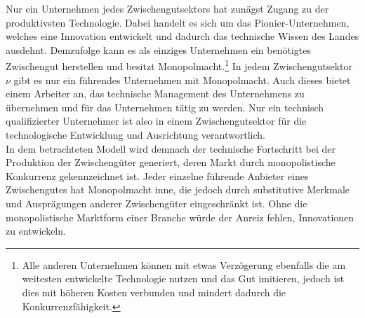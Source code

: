 %
Nur ein Unternehmen jedes Zwischengutsektors hat zunägst Zugang zu der produktivsten Technologie.
Dabei handelt es sich um das Pionier-Unternehmen, welches eine Innovation entwickelt und dadurch das technische Wissen des Landes ausdehnt.  Demzufolge kann es als einziges Unternehmen ein benötigtes Zwischengut herstellen und besitzt Monopolmacht.\footnote{Alle anderen Unternehmen können mit etwas Verzögerung ebenfalls die am weitesten entwickelte Technologie nutzen und das Gut imitieren, jedoch ist dies mit höheren Kosten verbunden und mindert dadurch die Konkurrenzfähigkeit.} In jedem Zwischengutsektor $\nu$ gibt es nur ein führendes Unternehmen mit Monopolmacht. Auch dieses bietet einem Arbeiter an, das technische Management des Unternehmens zu übernehmen und für das Unternehmen tätig zu werden. Nur ein technisch qualifizierter Unternehmer ist also in einem Zwischengutsektor für die technologische Entwicklung  und Ausrichtung verantwortlich.\\
%
In dem betrachteten Modell wird demnach der technische Fortschritt bei der Produktion der Zwischengüter generiert, deren Markt durch monopolistische Konkurrenz gekennzeichnet ist. Jeder einzelne führende Anbieter eines Zwischengutes hat Monopolmacht inne, die jedoch durch substitutive Merkmale und Ausprägungen anderer Zwischengüter eingeschränkt ist. Ohne die monopolistische Marktform einer Branche würde der Anreiz fehlen, Innovationen zu entwickeln.
%
